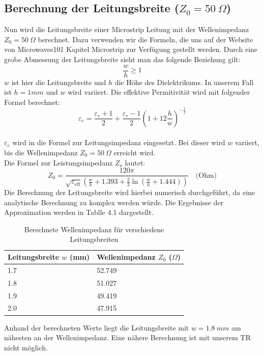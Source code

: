     \subsection{\texorpdfstring{Berechnung der Leitungsbreite ($Z_0 = 50~\Omega$)}{Berechnung der Leitungsbreite (Z0 = 50 Ohm)}}
    Nun wird die Leitungsbreite einer Microstrip Leitung mit der Wellenimpedanz $Z_0 = 50~\Omega$ berechnet.
    Dazu verwenden wir die Formeln, die uns auf der Website von Microwaves101 Kapitel Microstrip zur
    Verfügung gestellt werden. Durch eine grobe Abmessung der Leitungsbreite sieht man das folgende Beziehung gilt: \\
    \[
    \frac{w}{h} \geq 1
    \]
    $w$ ist hier die Leitungsbreite und $h$ die Höhe des Dielektrikums. In unserem Fall ist $h = 1mm$ und $w$ wird variiert. Die 
    effektive Permitivität wird mit folgender Formel berechnet:
      \[
    \varepsilon_e = \frac{\varepsilon_r + 1}{2} + \frac{\varepsilon_r - 1}{2} \left( 1 + 12 \frac{h}{w} \right)^{-\frac{1}{2}}
    \]
   \\ $\varepsilon_e$ wird in die Formel zur Leitungsimpedanz eingesetzt. Bei dieser wird $w$
    variiert, bis die Wellenimpedanz $Z_0 = 50~\Omega$ erreicht wird.
    \\
    Die Formel zur Leistungsimpedanz $Z_o$ lautet:
    \[
    Z_0 = \frac{120 \pi}{\sqrt{\varepsilon_{\text{eff}}} \left( \frac{w}{h} + 1.393 + \frac{2}{3} \ln\left( \frac{w}{h} + 1.444 \right) \right)} \quad \text{(Ohm)}
    \]
    Die Berechnung der Leitungsbreite wird hierbei numerisch durchgeführt, da eine analytische Berechnung zu
    komplex werden würde. Die Ergebnisse der Approximation werden in Tablle 4.1 dargestellt. \\
    
    \begin{table}[H]
        \centering
        \begin{tabular}{|l|l|}
            \hline
            \textbf{Leitungsbreite $w$ (mm)} & \textbf{Wellenimpedanz $Z_0$ ($\Omega$)} \\
            \hline
            1.7 & 52.749 \\
            1.8 & 51.027 \\
            1.9 & 49.419 \\
            2.0 & 47.915 \\
           
            \hline
        \end{tabular}
        \caption{Berechnete Wellenimpedanz für verschiedene Leitungsbreiten}
    \end{table}
    Anhand der berechneten Werte liegt die Leitungsbreite mit $w = 1.8~mm$ am nähesten an der Wellenimpedanz.
    Eine nähere Berechnung ist mit unserem TR nicht möglich. 

